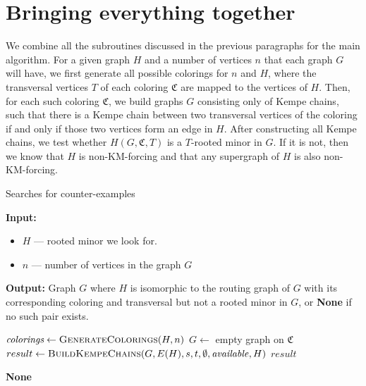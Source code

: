 \section{Bringing everything together}
\label{main:algo:section}

We combine all the subroutines discussed in the previous paragraphs for the main algorithm. For a given graph  
$H$ and a number of vertices $n$ that each graph $G$ will have, we first generate all possible colorings for $n$ and $H$, where  
the transversal vertices $T$ of each coloring $\mathfrak{C}$ are mapped to the vertices of $H$. Then, for each such coloring $\mathfrak{C}$, we build graphs $G$ consisting only  
of Kempe chains, such that there is a Kempe chain between two transversal vertices of the coloring if and only if those two vertices  
form an edge in $H$. After constructing all Kempe chains, we test whether $H(G, \mathfrak{C}, T)$ is a $T$-rooted minor in $G$. If it is not,
then we know that $H$ is non-KM-forcing and that any supergraph of $H$ is also non-KM-forcing.

\begin{algorithm}[H]
    \caption{Searches for counter-examples}
    \label{alg:rooted_minor_search}
    \begin{algorithmic}[1]
      \Statex \textbf{Input:}
      \begin{itemize}
        \item $H$ — rooted minor we look for.
        \item $n$ — number of vertices in the graph $G$
      \end{itemize}
      \Statex \textbf{Output:} Graph $G$ where $H$ is isomorphic to the routing graph of $G$ with its corresponding coloring and transversal but not a rooted minor in $G$, or \textbf{None} if no such pair exists.
  
      \State $\textit{colorings} \gets \textsc{GenerateColorings}(H, n)$
        \State $G \gets$ empty graph on $\mathfrak{C}$
        \State $result \gets \textsc{BuildKempeChains}(G, E(H), s, t, \emptyset, \mathit{available}, H)$
          \State \Return $result$ 
        \EndIf
      \EndFor
  
      \State \Return \textbf{None} 
    \end{algorithmic}
  \end{algorithm}

